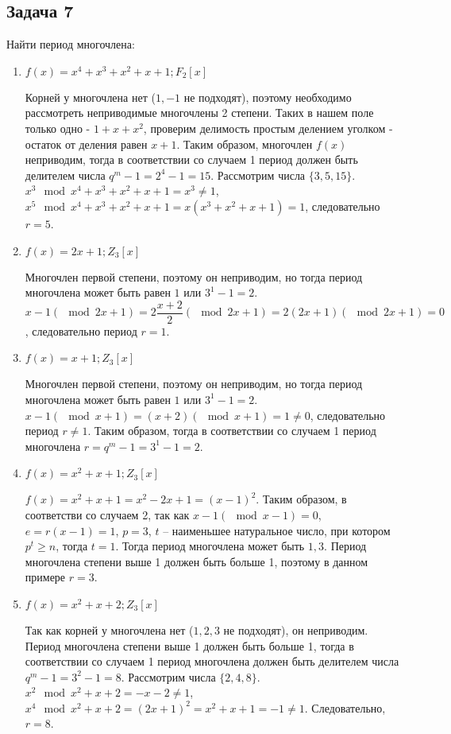 \documentclass[utf8x, 14pt]{G7-32} %
\begin{document}
\subsection{Задача 7}
Найти период многочлена:
\begin{enumerate}
    \item $f(x)=x^4+x^3+x^2+x+1; F_2[x]$
    
    Корней у многочлена нет ($1,-1$ не подходят), поэтому необходимо рассмотреть неприводимые многочлены 2 степени. Таких в нашем поле только одно - $1 + x + x^2$, проверим делимость простым делением уголком - остаток от деления равен $x+1$. Таким образом, многочлен $f(x)$ неприводим, тогда в соответствии со случаем 1 период должен быть делителем числа $ q^m -1 = 2^4 - 1 = 15$. Рассмотрим числа $\{3, 5, 15\}$. $x^3 \mod x^4+x^3+x^2+x+1 = x^3 \neq 1$, $x^5 \mod x^4+x^3+x^2+x+1 = x(x^3+x^2+x+1) = 1$, следовательно $r= 5$.

    \item $f(x)=2x+1; Z_3[x]$
    
    Многочлен первой степени, поэтому он неприводим, но тогда период многочлена может быть равен $1$ или $3^1-1 = 2$. $x -1 (\mod{2x + 1}) = 2\dfrac{x + 2}{2} (\mod{2x + 1}) = 2(2x + 1) (\mod{2x + 1}) = 0$, следовательно период $r = 1$.
    
    \item $f(x)=x+1; Z_3[x]$
    
    Многочлен первой степени, поэтому он неприводим, но тогда период многочлена может быть равен $1$ или $3^1-1 = 2$. $x - 1 (\mod{x + 1}) = (x + 2) (\mod{x + 1}) = 1 \neq 0$, следовательно период $r \neq 1$. Таким образом, тогда в соответствии со случаем 1 период многочлена $r = q^m -1 = 3^1 -1 = 2$.
    
    \item $f(x)=x^2+x+1; Z_3[x]$
    
    $f(x) = x^2 + x + 1 = x^2 -2x +1 = (x - 1)^2$. Таким образом, в соответстви со случаем 2, так как $x - 1 (\mod{x - 1}) = 0$, $e = r(x-1) = 1$, $p = 3$, $t$ – наименьшее натуральное число, при котором $p^t\geq n$, тогда $t = 1$. Тогда период многочлена может быть ${1, 3}$. Период многочлена степени выше 1 должен быть больше 1, поэтому в данном примере $r = 3$.

    \item $f(x)=x^2+x+2; Z_3[x]$
    
    Так как корней у многочлена нет ($1,2,3$ не подходят), он неприводим. Период многочлена степени выше 1 должен быть больше 1, тогда в соответствии со случаем 1 период многочлена должен быть делителем числа $q^m -1 = 3^2 -1 = 8$. Рассмотрим числа $\{2, 4, 8\}$. $x^2 \mod x^2 + x +2 = - x - 2 \neq 1$,  $x^4 \mod x^2 + x +2 = (2x + 1)^2 = x^2 + x + 1 = - 1 \neq 1$. Следовательно, $r=8$.


\end{enumerate}
\end{document}
